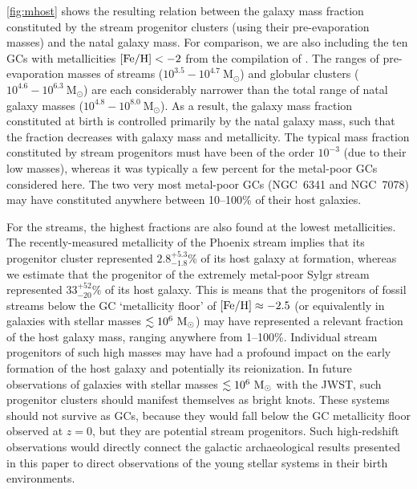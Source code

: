 \documentclass[twocolumn]{aastex63}
\newcommand{\msun}{\ensuremath{\textrm{M}_\odot}}
\begin{document}
\autoref{fig:mhost} shows the resulting relation between the galaxy mass fraction constituted by the stream progenitor clusters (using their pre-evaporation masses) and the natal galaxy mass. For comparison, we are also including the ten GCs with metallicities $[{\rm Fe}/{\rm H}]<-2$ from the compilation of \citet{kruijssen19e}. The ranges of pre-evaporation masses of streams ($10^{3.5}{-}10^{4.7}~\msun$) and globular clusters ($10^{4.6}{-}10^{6.3}~\msun$) are each considerably narrower than the total range of natal galaxy masses ($10^{4.8}{-}10^{8.0}~\msun$). As a result, the galaxy mass fraction constituted at birth is controlled primarily by the natal galaxy mass, such that the fraction decreases with galaxy mass and metallicity. The typical mass fraction constituted by stream progenitors must have been of the order $10^{-3}$ (due to their low masses), whereas it was typically a few percent for the metal-poor GCs considered here. The two very most metal-poor GCs (NGC~6341 and NGC~7078) may have constituted anywhere between 10--100\% of their host galaxies.

For the streams, the highest fractions are also found at the lowest metallicities. The recently-measured metallicity of the Phoenix stream \citep{wan20} implies that its progenitor cluster represented $2.8_{-1.8}^{+5.3}$\% of its host galaxy at formation, whereas we estimate that the progenitor of the extremely metal-poor Sylgr stream \citep{ibata:2019,roederer:2019} represented $33_{-20}^{+52}$\% of its host galaxy. This is means that the progenitors of fossil streams below the GC `metallicity floor' \citep{beasley:2019,kruijssen19c} of $[{\rm Fe}/{\rm H}]\approx-2.5$ (or equivalently in galaxies with stellar masses $\la10^6~\msun$) may have represented a relevant fraction of the host galaxy mass, ranging anywhere from 1--100\%. Individual stream progenitors of such high masses may have had a profound impact on the early formation of the host galaxy and potentially its reionization. In future observations of galaxies with stellar masses $\la10^6~\msun$ with the JWST, such progenitor clusters should manifest themselves as bright knots. These systems should not survive as GCs, because they would fall below the GC metallicity floor observed at $z=0$, but they are potential stream progenitors. Such high-redshift observations would directly connect the galactic archaeological results presented in this paper to direct observations of the young stellar systems in their birth environments.
\end{document}
